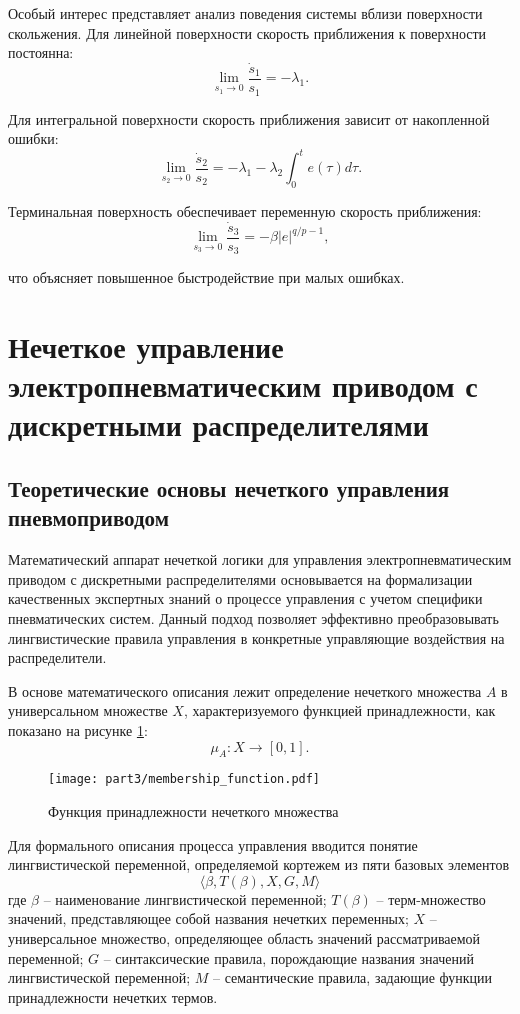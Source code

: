 Особый интерес представляет анализ поведения системы вблизи поверхности скольжения.
Для линейной поверхности скорость приближения к поверхности постоянна:
$$
\lim_{s_1 \to 0} \frac{\dot{s}_1}{s_1} = -\lambda_1.
$$

Для интегральной поверхности скорость приближения зависит от накопленной ошибки:
$$
\lim_{s_2 \to 0} \frac{\dot{s}_2}{s_2} = -\lambda_1 - \lambda_2\int_0^t e(\tau)d\tau.
$$

Терминальная поверхность обеспечивает переменную скорость приближения:
$$
\lim_{s_3 \to 0} \frac{\dot{s}_3}{s_3} = -\beta|e|^{q/p-1},
$$

что объясняет повышенное быстродействие при малых ошибках.

\section{Нечеткое управление электропневматическим приводом с дискретными распределителями}\label{sec:ch3/sec4}
\subsection{Теоретические основы нечеткого управления пневмоприводом}\label{subsec:ch3/sec4/sub1}

Математический аппарат нечеткой логики для управления электропневматическим приводом
с дискретными распределителями основывается на формализации качественных экспертных знаний
о процессе управления с учетом специфики пневматических систем. Данный подход позволяет эффективно
преобразовывать лингвистические правила управления в конкретные управляющие воздействия на распределители.

В основе математического описания лежит определение нечеткого множества $A$ в
универсальном множестве $X$, характеризуемого
функцией принадлежности, как показано на рисунке \ref{fig:membership_functions}:
\begin{equation*}
\mu_A: X \rightarrow \left[0,1\right].
\end{equation*}

\begin{figure}[ht]
\centering
\texttt{[image: part3/membership\_function.pdf]}
\caption{Функция принадлежности нечеткого множества}
\label{fig:membership_functions}
\end{figure}

Для формального описания процесса управления вводится понятие лингвистической переменной,
определяемой кортежем из пяти базовых элементов 
\begin{equation*}
\langle \beta, T(\beta), X, G, M \rangle
\end{equation*}
где $\beta$ -- наименование лингвистической переменной;
$T(\beta)$ -- терм-множество значений, представляющее собой названия нечетких переменных;
$X$ -- универсальное множество, определяющее область значений рассматриваемой переменной;
$G$ -- синтаксические правила, порождающие названия значений лингвистической переменной;
$M$ -- семантические правила, задающие функции принадлежности нечетких термов.

